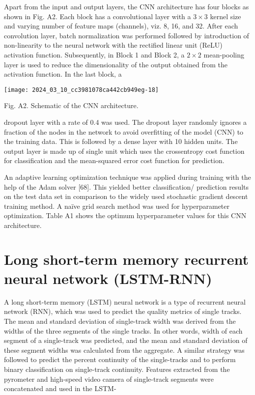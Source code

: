 \documentclass[10pt]{article}
\begin{document}
Apart from the input and output layers, the CNN architecture has four blocks as shown in Fig. A2. Each block has a convolutional layer with a $3 \times 3$ kernel size and varying number of feature maps (channels), viz. 8, 16, and 32. After each convolution layer, batch normalization was performed followed by introduction of non-linearity to the neural network with the rectified linear unit (ReLU) activation function. Subsequently, in Block 1 and Block 2, a $2 \times 2$ mean-pooling layer is used to reduce the dimensionality of the output obtained from the activation function. In the last block, a

\begin{center}
\texttt{[image: 2024\_03\_10\_cc3981078ca442cb949eg-18]}
\end{center}

Fig. A2. Schematic of the CNN architecture.

dropout layer with a rate of 0.4 was used. The dropout layer randomly ignores a fraction of the nodes in the network to avoid overfitting of the model (CNN) to the training data. This is followed by a dense layer with 10 hidden units. The output layer is made up of single unit which uses the crossentropy cost function for classification and the mean-squared error cost function for prediction.

An adaptive learning optimization technique was applied during training with the help of the Adam solver [68]. This yielded better classification/ prediction results on the test data set in comparison to the widely used stochastic gradient descent training method. A naïve grid search method was used for hyperparameter optimization. Table A1 shows the optimum hyperparameter values for this CNN architecture.

\section*{Long short-term memory recurrent neural network (LSTM-RNN)}
A long short-term memory (LSTM) neural network is a type of recurrent neural network (RNN), which was used to predict the quality metrics of single tracks. The mean and standard deviation of single-track width was derived from the widths of the three segments of the single tracks. In other words, width of each segment of a single-track was predicted, and the mean and standard deviation of these segment widths was calculated from the aggregate. A similar strategy was followed to predict the percent continuity of the single-tracks and to perform binary classification on single-track continuity. Features extracted from the pyrometer and high-speed video camera of single-track segments were concatenated and used in the LSTM-
\end{document}

